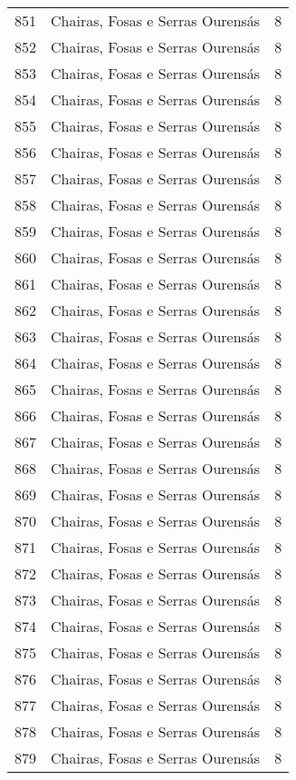 \begin{table}[p]
\begin{tabular}{rlr}
  851 & Chairas, Fosas e Serras Ourensás &   8 \\ 
  852 & Chairas, Fosas e Serras Ourensás &   8 \\ 
  853 & Chairas, Fosas e Serras Ourensás &   8 \\ 
  854 & Chairas, Fosas e Serras Ourensás &   8 \\ 
  855 & Chairas, Fosas e Serras Ourensás &   8 \\ 
  856 & Chairas, Fosas e Serras Ourensás &   8 \\ 
  857 & Chairas, Fosas e Serras Ourensás &   8 \\ 
  858 & Chairas, Fosas e Serras Ourensás &   8 \\ 
  859 & Chairas, Fosas e Serras Ourensás &   8 \\ 
  860 & Chairas, Fosas e Serras Ourensás &   8 \\ 
  861 & Chairas, Fosas e Serras Ourensás &   8 \\ 
  862 & Chairas, Fosas e Serras Ourensás &   8 \\ 
  863 & Chairas, Fosas e Serras Ourensás &   8 \\ 
  864 & Chairas, Fosas e Serras Ourensás &   8 \\ 
  865 & Chairas, Fosas e Serras Ourensás &   8 \\ 
  866 & Chairas, Fosas e Serras Ourensás &   8 \\ 
  867 & Chairas, Fosas e Serras Ourensás &   8 \\ 
  868 & Chairas, Fosas e Serras Ourensás &   8 \\ 
  869 & Chairas, Fosas e Serras Ourensás &   8 \\ 
  870 & Chairas, Fosas e Serras Ourensás &   8 \\ 
  871 & Chairas, Fosas e Serras Ourensás &   8 \\ 
  872 & Chairas, Fosas e Serras Ourensás &   8 \\ 
  873 & Chairas, Fosas e Serras Ourensás &   8 \\ 
  874 & Chairas, Fosas e Serras Ourensás &   8 \\ 
  875 & Chairas, Fosas e Serras Ourensás &   8 \\ 
  876 & Chairas, Fosas e Serras Ourensás &   8 \\ 
  877 & Chairas, Fosas e Serras Ourensás &   8 \\ 
  878 & Chairas, Fosas e Serras Ourensás &   8 \\ 
  879 & Chairas, Fosas e Serras Ourensás &   8 \\ 

\end{tabular}
\end{table}
